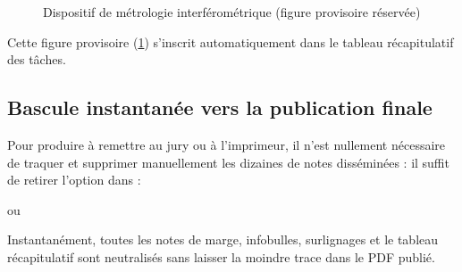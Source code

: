 \begin{figure}[htbp]
  \centering
  \caption{Dispositif de métrologie interférométrique (figure provisoire réservée)}
  \label{fig:emplacement-reserve}
\end{figure}

Cette figure provisoire (\cref{fig:emplacement-reserve}) s'inscrit automatiquement dans le tableau récapitulatif des tâches.

\subsection{Bascule instantanée vers la publication finale}
Pour produire  à remettre au jury ou à l'imprimeur,
il n'est nullement nécessaire de traquer et supprimer manuellement les dizaines de notes disséminées :
il suffit de retirer l'option  dans  :
\begin{center}
   \quad ou \quad {}
\end{center}
Instantanément, toutes les notes de marge, infobulles, surlignages et le tableau récapitulatif
sont neutralisés sans laisser la moindre trace dans le PDF publié.
